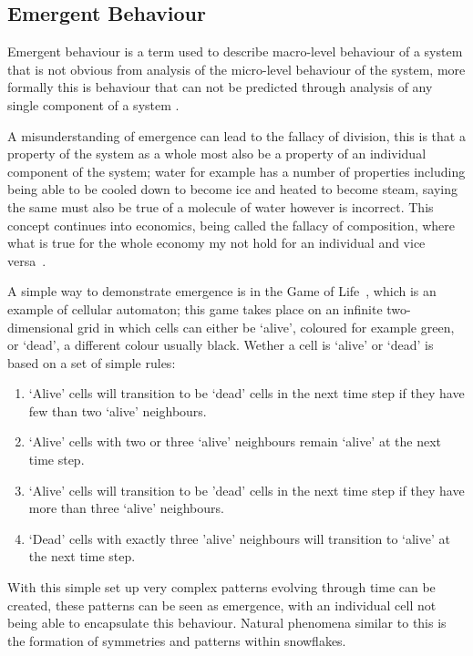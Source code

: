 \documentclass{article}
\begin{document}
\subsection{Emergent Behaviour}
Emergent behaviour is a term used to describe macro-level behaviour of a system that is not obvious from analysis of the micro-level behaviour of the system, more formally this is behaviour that can not be predicted through analysis of any single component of a system \cite{EB_systemofsystemsGLangford}.

A misunderstanding of emergence can lead to the fallacy of division, this is that a property of the system as a whole most also be a property of an individual component of the system; water for example has a number of properties including being able to be cooled down to become ice and heated to become steam, saying the same must also be true of a molecule of water however is incorrect. This concept continues into economics, being called the fallacy of composition, where what is true for the whole economy my not hold for an individual and vice versa~\cite{fallacyofcompostionBook}.
       
A simple way to demonstrate emergence is in the Game of Life~\cite{gameoflifepage}, which is an example of cellular automaton; this game takes place on an infinite two-dimensional grid in which cells can either be `alive', coloured for example green, or `dead', a different colour usually black. Wether a cell is `alive' or `dead' is based on a set of simple rules:   
\begin{enumerate}
  \item `Alive' cells will transition to be `dead' cells in the next time step if they have few than two `alive' neighbours.
  \item `Alive' cells with two or three `alive' neighbours remain `alive' at the next time step.
  \item `Alive' cells will transition to be 'dead' cells in the next time step if they have more than three `alive' neighbours.
  \item `Dead' cells with exactly three 'alive' neighbours will transition to `alive' at the next time step.
\end{enumerate}
With this simple set up very complex patterns evolving through time can be created, these patterns can be seen as emergence, with an individual cell not being able to encapsulate this behaviour. Natural phenomena similar to this is the formation of symmetries and patterns within snowflakes.
\end{document}
